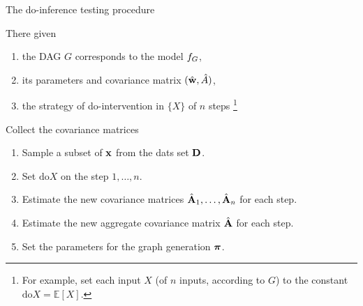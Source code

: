 \documentclass{beamer}
\begin{document}
\begin{frame}{The do-inference testing procedure}

\begin{block}{There given}
\begin{enumerate}[1)]
\item the DAG $G$ corresponds to the model ${f_{G}}$,
\item its parameters and covariance matrix $(\hat{\mathbf{w}}, \hat{A})$,
\item the strategy of do-intervention in $\{X\}$ of $n$ steps%
\footnote{For example, set each input $X$ (of $n$ inputs, according to $G$) to the constant $ \text{do}X = \mathbb{E}[X]$.}
\end{enumerate}
\end{block}
 
\begin{block}{Collect the covariance matrices}
\begin{enumerate}
\item Sample a subset of $\mathbf{x}$ from the dats set $\mathbf{D}$.
\item Set $\text{do}X$ on the step $1,\dots,n$.
\item Estimate the new covariance matrices $\hat{\mathbf{A}}_1,\dots,\hat{\mathbf{A}}_n$ for each step.
\item Estimate the new aggregate covariance matrix $\hat{\mathbf{A}}$ for each step.
\item Set the parameters for the graph generation ${\boldsymbol{\pi}}$. 
\end{enumerate}
\end{block}
\end{frame}
\end{document}
